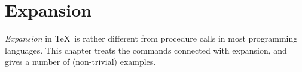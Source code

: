 \documentclass[letterpaper]{book}
\begin{document}
\chapter{Expansion}\label{expand}

\emph{Expansion} in \TeX\ is rather different from
procedure calls in most programming languages. This chapter treats the
commands connected with expansion, and gives a number of (non-trivial)
examples.
\end{document}
